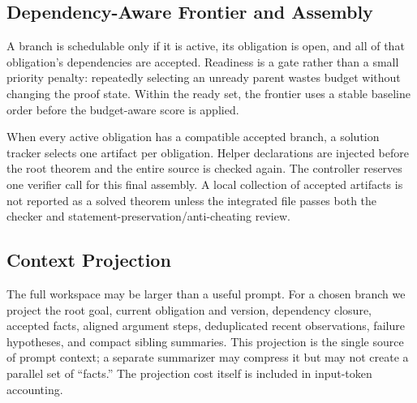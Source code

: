\subsection{Dependency-Aware Frontier and Assembly}

A branch is schedulable only if it is active, its obligation is open, and all
of that obligation's dependencies are accepted. Readiness is a gate rather
than a small priority penalty: repeatedly selecting an unready parent wastes
budget without changing the proof state. Within the ready set, the frontier
uses a stable baseline order before the budget-aware score is applied.

When every active obligation has a compatible accepted branch, a solution
tracker selects one artifact per obligation. Helper declarations are injected
before the root theorem and the entire source is checked again. The controller
reserves one verifier call for this final assembly. A local collection of
accepted artifacts is not reported as a solved theorem unless the integrated
file passes both the checker and statement-preservation/anti-cheating review.

\subsection{Context Projection}

The full workspace may be larger than a useful prompt. For a chosen branch we
project the root goal, current obligation and version, dependency closure,
accepted facts, aligned argument steps, deduplicated recent observations,
failure hypotheses, and compact sibling summaries. This projection is the
single source of prompt context; a separate summarizer may compress it but may
not create a parallel set of ``facts.'' The projection cost itself is included
in input-token accounting.
